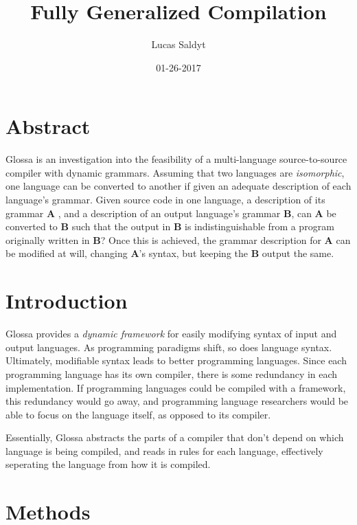 \documentclass{article}
\title{Fully Generalized Compilation}
\date{01-26-2017}
\author{Lucas Saldyt}
\begin{document}
\maketitle
{}
\newpage
{}

\section{Abstract}
Glossa is an investigation into the feasibility of a multi-language source-to-source compiler with dynamic grammars. 
Assuming that two languages are \textit{isomorphic}, one language can be converted to another if given an adequate description of each language's grammar.
Given source code in one language, a description of its grammar \textbf{A} , and a description of an output language's grammar \textbf{B}, can \textbf{A} be converted to \textbf{B} such that the output in \textbf{B} is indistinguishable from a program originally written in \textbf{B}?
Once this is achieved, the grammar description for \textbf{A} can be modified at will, changing \textbf{A}'s syntax, but keeping the \textbf{B} output the same. 

\section{Introduction}

Glossa provides a \textit{dynamic framework} for easily modifying syntax of input and output languages. 
As programming paradigms shift, so does language syntax. Ultimately, modifiable syntax leads to better programming languages. 
Since each programming language has its own compiler, there is some redundancy in each implementation. If programming languages could be compiled with a framework, this redundancy would go away, and programming language researchers would be able to focus on the language itself, as opposed to its compiler.

Essentially, Glossa abstracts the parts of a compiler that don't depend on which language is being compiled, and reads in rules for each language, effectively seperating the language from how it is compiled. 

\section{Methods}
\end{document}
